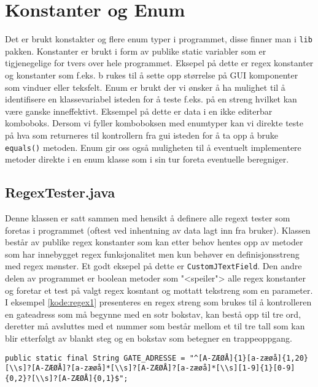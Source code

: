 \section{Konstanter og Enum}
Det er brukt konstakter og flere enum typer i programmet, disse finner man i \texttt{lib} pakken. Konstanter er brukt i form av publike static variabler som er tigjenegelige for tvers over hele programmet. Eksepel på dette er regex konstanter og konstanter som f.eks. b rukes til å sette opp størrelse på GUI komponenter som vinduer eller teksfelt. Enum er brukt der vi ønsker å ha mulighet til å identifisere en klassevariabel isteden for å teste f.eks. på en streng hvilket kan være ganske inneffektivt. Eksempel på dette er data i en ikke editerbar komboboks. Dersom vi fyller komboboksen med enumtyper kan vi direkte teste på hva som returneres til kontrollern fra gui isteden for å ta opp å bruke \texttt{equals()} metoden. Enum gir oss også muligheten til å eventuelt implementere metoder direkte i en enum klasse som i sin tur foreta eventuelle beregniger. 

\subsection{RegexTester.java}
Denne klassen er satt sammen med hensikt å definere alle regext tester som foretas i programmet (oftest ved inhentning av data lagt inn fra bruker). Klassen består av publike regex konstanter som kan etter behov hentes opp av metoder som har innebygget regex funksjonalitet men kun behøver en definisjonsstreng med regex mønster. Et godt eksepel på dette er \texttt{CustomJTextField}. Den andre delen av programmet er boolean metoder som "<speiler"> alle regex konstanter og foretar et test på valgt regex kosntant og mottatt tekstreng som en parameter. 
I eksempel \ref{kode:regex1} presenteres en regex streng som brukes til å kontrolleren en gateadress som må begynne med en sotr bokstav, kan bestå opp til tre ord, deretter må avsluttes med et nummer som består mellom et til tre tall som kan blir etterfølgt av blankt steg og en bokstav som betegner en trappeoppgang.

\begin{lstlisting}[caption=Regexstreng for gateadresse og husnummer.,label=kode:regex1]
	public static final String GATE_ADRESSE = "^[A-ZÆØÅ]{1}[a-zæøå]{1,20}[\\s]?[A-ZÆØÅ]?[a-zæøå]*[\\s]?[A-ZÆØÅ]?[a-zæøå]*[\\s][1-9]{1}[0-9]{0,2}?[\\s]?[A-ZÆØÅ]{0,1}$";
\end{lstlisting}

